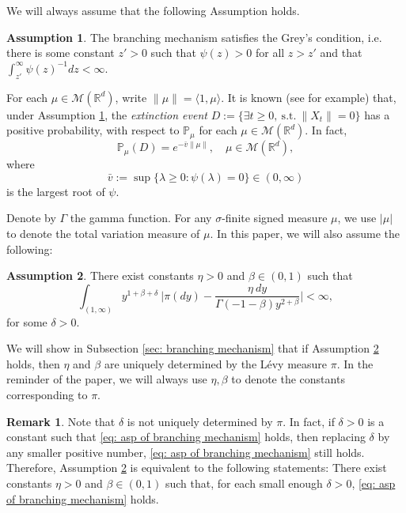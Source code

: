 \documentclass[12pt,a4paper]{amsart}
\theoremstyle{plain}
\theoremstyle{definition}
\newtheorem{rem}[thm]{Remark}
\newtheorem{asp}{Assumption}
\numberwithin{equation}{section}
\begin{document}
	We will always assume that the following Assumption holds.
\begin{asp}
\label{asp: Greys condition}
	The branching mechanism satisfies the Grey's condition, i.e. there is some constant $z' > 0$ such that $\psi(z) > 0$ for all $z>z'$ and that $\int_{z'}^\infty \psi(z)^{-1}dz < \infty$.
\end{asp}
    For each $\mu \in \mathcal M(\mathbb R^d)$, write $\|\mu\| = \langle 1, \mu\rangle$.
	It is known (see \cite[Theorems 12.5 \& 12.7]{Kyprianou2014Fluctuations} for example) that, under Assumption \ref{asp: Greys condition}, 
	the \emph{extinction event} 
	$D:=\{\exists t\geq 0,~\text{s.t.}~\|X_t\|=0\}$ has a positive probability, with respect to $\mathbb P_\mu$ for each  $\mu \in \mathcal M(\mathbb R^d)$.
    In fact,
\begin{equation}
    \mathbb{P}_{\mu} (D)
    = e^{-\bar v \|\mu\|},
    \quad \mu\in \mathcal M(\mathbb R^d),
\end{equation}
    where
\[
	\bar v := \sup\{\lambda \geq 0: \psi(\lambda) = 0\} \in (0,\infty)
\]
	is the largest root of $\psi$.

    Denote by $\Gamma$ the gamma function.
For any $\sigma$-finite signed measure $\mu$, we use $|\mu|$ to denote the total variation measure of $\mu$.
    In this paper, we will also assume the following:
\begin{asp}
\label{asp: branching mechanism}
    There exist constants $\eta > 0$ and $\beta \in (0,1)$ such that
\begin{equation}
\label{eq: asp of branching mechanism}
    \int_{(1,\infty)}y^{1+\beta +\delta}~\Big|\pi(dy)-\frac{\eta~dy}{\Gamma(-1-\beta)y^{2+\beta}}\Big| <\infty,
\end{equation}
	for some $\delta > 0$.
\end{asp}
	We will show in Subsection \ref{sec: branching mechanism} that if Assumption \ref{asp: branching mechanism} holds, then $\eta$ and $\beta$ are uniquely determined by the L\'evy measure $\pi$.
	In the reminder of the paper, we will always use $\eta,\beta$ to denote the constants corresponding to $\pi$.
\begin{rem}
\label{rem: small enough delta}
	Note that $\delta$ is not uniquely determined by $\pi$.
	In fact, if $\delta>0$ is a constant such that \eqref{eq: asp of branching mechanism} holds, then replacing $\delta$ by any smaller positive number, \eqref{eq: asp of branching mechanism} still holds.
	Therefore, Assumption \ref{asp: branching mechanism} is equivalent to the following statements: There exist constants $\eta > 0$ and $\beta \in (0,1)$ such that, for each small enough $\delta>0$, \eqref{eq: asp of branching mechanism} holds.
\end{rem}
\end{document}
